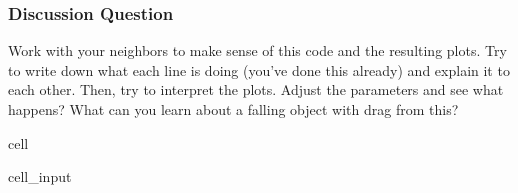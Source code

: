 \documentclass[letterpaper,10pt,english]{jupyterBook}
\begin{document}
\subsubsection{Discussion Question}
\label{\detokenize{content/2_oscillations/activity-SHO_and_dynamical_systems:id3}}
\sphinxAtStartPar
{}

\sphinxAtStartPar
Work with your neighbors to make sense of this code and the resulting plots. Try to write down what each line is doing (you’ve done this already) and explain it to each other. Then, try to interpret the plots. Adjust the parameters and see what happens? What can you learn about a falling object with drag from this?

\begin{sphinxuseclass}{cell}\begin{sphinxVerbatimInput}

\begin{sphinxuseclass}{cell_input}
\begin{sphinxVerbatim}[commandchars=\\\{\}]
   

    
       
      \PYG{p}{[} \PYG{p}{]} 
     

   



\end{sphinxVerbatim}
\end{sphinxuseclass}
\end{sphinxVerbatimInput}
\end{sphinxuseclass}
\end{document}
